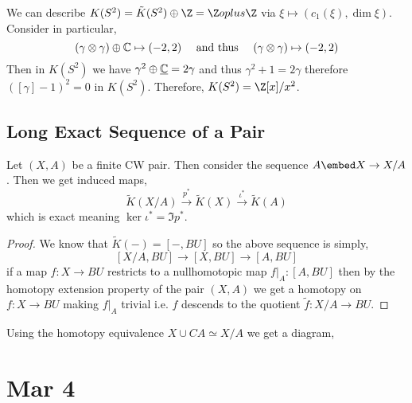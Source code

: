 \documentclass[12pt]{extarticle}
\begin{document}
\begin{rmk}
We can describe $K(S^2) = \tilde{K}(S^2) \oplus \Z = \Z oplus \Z$ via $\xi \mapsto (c_1(\xi), \dim{\xi})$. Consider in particular,
\[ (\gamma \otimes \gamma) \oplus \mathbb{C} \mapsto (-2, 2) \quad \text{ and thus } \quad (\gamma \otimes \gamma) \mapsto (-2, 2) \]
Then in $K(S^2)$ we have $\gamma^2 \oplus \underline{\mathbb{C}} = 2 \gamma$ and thus $\gamma^2 + 1 = 2 \gamma$ therefore $([\gamma] - 1)^2 = 0$ in $K(S^2)$. Therefore, $K(S^2) = \Z[x]/x^2$. 
\end{rmk}

\subsection{Long Exact Sequence of a Pair}

\begin{lemma}
Let $(X, A)$ be a finite CW pair. Then consider the sequence $A \embed X \to X / A$. Then we get induced maps,
\[ \tilde{K}(X/A) \xrightarrow{p^*} \tilde{K}(X) \xrightarrow{\iota^*} \tilde{K}(A) \]
which is exact meaning $\ker{\iota^*} = \Im{p^*}$.
\end{lemma}

\begin{proof}
We know that $\tilde{K}(-) = [-, BU]$ so the above sequence is simply,
\[ [X/A, BU] \to [X, BU] \to [A, BU]  \]
if a map $f : X \to BU$ restricts to a nullhomotopic map $f|_A : [A, BU]$ then by the homotopy extension property of the pair $(X, A)$ we get a homotopy on $f : X \to BU$ making $f |_A$ trivial i.e. $f$ descends to the quotient $\tilde{f} : X / A \to BU$.  
\end{proof}

\begin{rmk}
Using the homotopy equivalence $X \cup CA \simeq X/A$ we get a diagram,
\begin{center}
\end{center}
\end{rmk}

\section{Mar 4}
\end{document}
